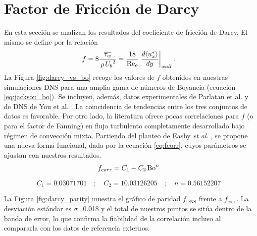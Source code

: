 \newpage
\section{Factor de Fricción de Darcy}

En esta sección se analizan los resultados del coeficiente de fricción de Darcy. El mismo se define por la relación
\begin{equation}
f = 8 \frac{ \overline{\tau_w}}{\hspace{0.5mm} \rho \hspace{0.5mm} {U_b}^2 }  = \frac{18}{\text{Re}_o} \left.\frac{d \langle u^*_x \rangle}{dy}\right\vert_{wall} \text{.}
\label{eq:darcy}
\end{equation}
La Figura \ref{fig:darcy_vs_bo} recoge los valores de $f$ obtenidos en nuestras simulaciones DNS para una amplia gama de números de Boyancia (ecuación \ref{eq:jackson_bo}). Se incluyen, además, datos experimentales de Parlatan et al. \cite{parlatan1996buoyancy} y de DNS de You et al. \cite{you2003direct}. La coincidencia de tendencias entre los tres conjuntos de datos es favorable. Por otro lado, la literatura ofrece pocas correlaciones para $f$ (o para el factor de Fanning) en flujo turbulento completamente desarrollado bajo régimen de convección mixta. Partiendo del planteo de Easby \textit{et al.} \cite{easby1978effect}, se propone una nueva forma funcional, dada por la ecuación \ref{eq:fcorr}, cuyos parámetros se ajustan con nuestros resultados.
\begin{equation}
f_{corr} = C_1 + C_2 \hspace*{0.5mm} \text{Bo}^n
\label{eq:fcorr}
\end{equation}

\begin{small}
$$
C_1 = 0.03071701 \quad ; \quad C_2 = 10.03126205 \quad ; \quad n = 0.56152207
$$
\end{small}

La Figura \ref{fig:darcy_parity} muestra el gráfico de paridad $f_{\text{DNS}}$ frente a $f_{\text{corr}}$. La desviación estándar es $\sigma$=0.018 y el total de nuestros puntos se sitúa dentro de la banda de error, lo que confirma la fiabilidad de la correlación incluso al compararla con los datos de referencia externos.

